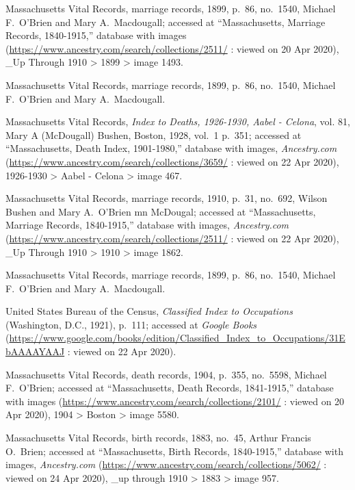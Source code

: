 \begin{thebibliography}{999}
Massachusetts Vital Records, marriage records, 1899, p.\ 86, no.\ 1540, Michael F.\ O'Brien and Mary A.\ Macdougall; accessed at ``Massachusetts, Marriage Records, 1840-1915,'' database with images (\url{https://www.ancestry.com/search/collections/2511/} : viewed on 20 Apr 2020), \_Up Through 1910 > 1899 > image 1493.

Massachusetts Vital Records, marriage records, 1899, p.\ 86, no.\ 1540, Michael F.\ O'Brien and Mary A.\ Macdougall.

Massachusetts Vital Records, \textit{Index to Deaths, 1926-1930, Aabel - Celona}, vol. 81, Mary A (McDougall) Bushen, Boston, 1928, vol.\ 1 p.\ 351; accessed at ``Massachusetts, Death Index, 1901-1980,'' database with images, \textit{Ancestry.com} (\url{https://www.ancestry.com/search/collections/3659/} : viewed on 22 Apr 2020), 1926-1930 > Aabel - Celona > image 467.

Massachusetts Vital Records, marriage records, 1910, p.\ 31, no.\ 692, Wilson Bushen and Mary A.\ O'Brien mn McDougal; accessed at ``Massachusetts, Marriage Records, 1840-1915,'' database with images, \textit{Ancestry.com} (\url{https://www.ancestry.com/search/collections/2511/} : viewed on 22 Apr 2020), \_Up Through 1910 > 1910 > image 1862.

Massachusetts Vital Records, marriage records, 1899, p.\ 86, no.\ 1540, Michael F.\ O'Brien and Mary A.\ Macdougall.

United States Bureau of the Census, \textit{Classified Index to Occupations} (Washington, D.C., 1921), p.\ 111; accessed at \textit{Google Books} (\url{https://www.google.com/books/edition/Classified_Index_to_Occupations/31EbAAAAYAAJ} : viewed on 22 Apr 2020).

Massachusetts Vital Records, death records, 1904, p.\ 355, no.\ 5598, Michael F.\ O'Brien; accessed at ``Massachusetts, Death Records, 1841-1915,'' database with images (\url{https://www.ancestry.com/search/collections/2101/} : viewed on 20 Apr 2020), 1904 > Boston > image 5580.

Massachusetts Vital Records, birth records, 1883, no.\ 45, Arthur Francis O.\ Brien; accessed at ``Massachusetts, Birth Records, 1840-1915,'' database with images, \textit{Ancestry.com} (\url{https://www.ancestry.com/search/collections/5062/} : viewed on 24 Apr 2020), \_up through 1910 > 1883 > image 957.


\end{thebibliography}

